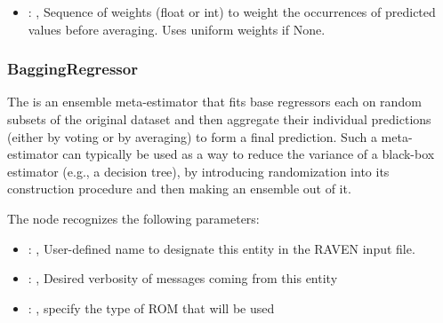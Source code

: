 \begin{itemize}
    \item {}: , 
      Sequence of weights (float or int) to weight the occurrences of predicted
      values before averaging. Uses uniform weights if None.
  \end{itemize}


\subsubsection{BaggingRegressor}
  The  is an ensemble meta-estimator that fits base regressors each on
  random subsets of the original                             dataset and then aggregate their
  individual predictions (either by voting or by averaging) to form a final
  prediction. Such a meta-estimator can typically be used as a way to reduce the variance of a
  black-box estimator                             (e.g., a decision tree), by introducing
  randomization into its construction procedure and then making an ensemble
  out of it.

  The  node recognizes the following parameters:
    \begin{itemize}
      \item {}: , 
        User-defined name to designate this entity in the RAVEN input file.
      \item {}: , 
        Desired verbosity of messages coming from this entity
      \item {}: , 
        specify the type of ROM that will be used
  \end{itemize}

